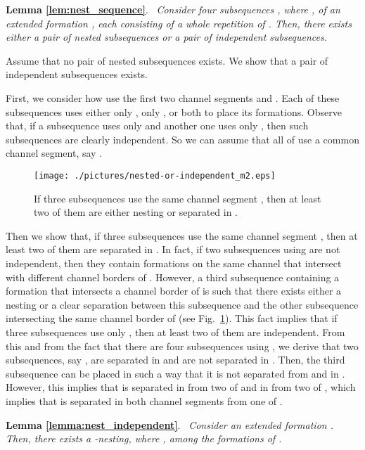 \documentclass[a4paper,10pt]{llncs}
\renewenvironment{proof}
{{\bf Proof:}}{\hspace*{\fill}\par\vspace{2mm}}
\newcommand{\rephrase}[3]{\noindent\textbf{#1 #2}.~\emph{#3}}
\begin{document}
\rephrase{Lemma}{\ref{lem:nest_sequence}}{
Consider four subsequences , where , of an extended formation , each consisting of a whole repetition of . Then, there exists either a pair of nested subsequences or a pair of independent subsequences.
}

\begin{proof}
Assume that no pair of nested subsequences exists. We show that a pair of independent subsequences exists.

First, we consider how  use the first two channel segments  and . Each of these subsequences uses either only , only , or both to place its formations. Observe that, if a subsequence uses only  and another one uses only , then such subsequences are clearly independent. So we can assume that all of  use a common channel segment, say .

\begin{figure}[ht]
\begin{center}
\texttt{[image: ./pictures/nested-or-independent\_m2.eps]}
\caption{If three subsequences use the same channel segment , then at least two of them are either nesting or separated in .}
\label{fig:nested-or-independent}
\end{center}
\end{figure}

Then we show that, if three subsequences use the same channel segment , then at least two of them are separated in . In fact, if two subsequences using  are not independent, then they contain formations on the same channel  that intersect with different channel borders of . However, a third subsequence containing a formation that intersects a channel border of  is such that there exists either a nesting or a clear separation between this subsequence and the other subsequence intersecting the same channel border of  (see Fig.~\ref{fig:nested-or-independent}). This fact implies that if three subsequences use only , then at least two of them are independent. From this and from the fact that there are four subsequences using , we derive that two subsequences, say , are separated in  and are not separated in . Then, the third subsequence  can be placed in such a way that it is not separated from  and  in . However, this implies that  is separated in  from two of  and in  from two of , which implies that  is separated in both channel segments from one of .
\end{proof}

\rephrase{Lemma}{\ref{lemma:nest_independent}}{
Consider an extended formation .
Then, there exists a -nesting, where , among the formations of .
}
\end{document}
